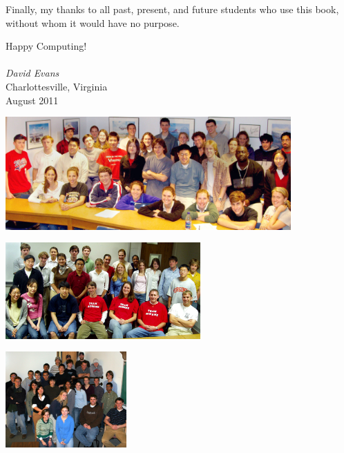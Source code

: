 Finally, my thanks to all past, present, and future students who use this book, without whom it would have no purpose.

%

Happy Computing!\\
\vspace*{1.0ex}\\
{\em David Evans}\\
Charlottesville, Virginia\\
August 2011\\
\vspace*{1ex}

\begin{center}
\includegraphics[width=4.3in]{images/cs200-spring2003-edited.jpg}
\end{center}

\begin{minipage}[c]{2.7in}
\center
\includegraphics[height=1.45in]{images/cs200-spring2004-edited.jpg}
\end{minipage}
\quad
\begin{minipage}[c]{2.4in}
\center
\includegraphics[height=1.45in]{images/cs150-fall2005-edited.jpg}
\end{minipage}
